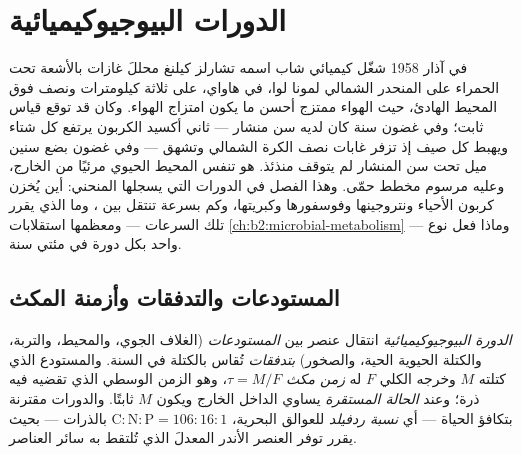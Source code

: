 \chapter{الدورات البيوجيوكيميائية}\label{ch:b2:biogeochemical-cycles}

في آذار 1958 شغّل كيميائي شاب اسمه تشارلز كيلنغ
محللَ غازات بالأشعة تحت الحمراء على المنحدر الشمالي لمونا لوا، في هاواي،
على ثلاثة كيلومترات ونصف فوق المحيط الهادئ، حيث الهواء
ممتزج أحسن ما يكون امتزاج الهواء. وكان قد توقع قياس ثابت؛
وفي غضون سنة كان لديه سن منشار --- ثاني أكسيد الكربون يرتفع كل
شتاء ويهبط كل صيف إذ تزفر غابات نصف الكرة
الشمالي وتشهق --- وفي غضون بضع سنين ميل
تحت سن المنشار لم يتوقف منذئذ. 
هو تنفس المحيط الحيوي مرئيًا من الخارج، وعليه مرسوم مخطط
حمّى. وهذا الفصل في الدورات التي يسجلها المنحني:
أين يُخزن كربون الأحياء ونتروجينها وفوسفورها وكبريتها،
وكم بسرعة تنتقل بين ، وما الذي يقرر تلك
السرعات --- ومعظمها استقلابات
\cref{ch:b2:microbial-metabolism} --- وماذا فعل نوع واحد
بكل دورة في مئتي سنة.

\section{المستودعات والتدفقات وأزمنة المكث}

\begin{definition}\label{def:b2:biogeochemical-cycles:reservoir}
\emph{الدورة البيوجيوكيميائية} انتقال عنصر بين
\emph{المستودعات} (الغلاف الجوي، والمحيط، والتربة، والكتلة الحيوية
الحية، والصخور) \emph{بتدفقات} تُقاس بالكتلة في السنة. والمستودع
الذي كتلته $M$ وخرجه الكلي $F$ له \emph{زمن
مكث} $\tau = M/F$، وهو الزمن الوسطي الذي تقضيه فيه ذرة؛ وعند
\emph{الحالة المستقرة} يساوي الداخل الخارج ويكون $M$ ثابتًا.
والدورات مقترنة بتكافؤ الحياة --- أي \emph{نسبة ردفيلد}
للعوالق البحرية، $\mathrm{C:N:P} =
106:16:1$ بالذرات --- بحيث يقرر توفر العنصر الأندر
المعدلَ الذي تُلتقط به سائر العناصر.
\end{definition}

